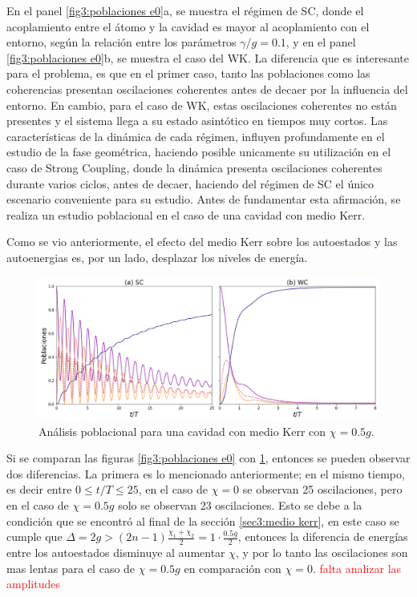 En el panel \ref{fig3:poblaciones e0}a, se muestra el régimen de SC, donde el acoplamiento entre el átomo y la cavidad es mayor al acoplamiento con el entorno, según la relación entre los parámetros $\gamma/g=0.1$, y en el panel \ref{fig3:poblaciones e0}b, se muestra el caso del WK. La diferencia que es interesante para el problema, es que en el primer caso, tanto las poblaciones como las coherencias presentan oscilaciones coherentes antes de decaer por la influencia del entorno. En cambio, para el caso de WK, estas oscilaciones coherentes no están presentes y el sistema llega a su estado asintótico en tiempos muy cortos. Las características de la dinámica de cada régimen, influyen profundamente en el estudio de la fase geométrica, haciendo posible unicamente su utilización en el caso de Strong Coupling, donde la dinámica presenta oscilaciones coherentes durante varios ciclos, antes de decaer, haciendo del régimen de SC el único escenario conveniente para su estudio. Antes de fundamentar esta afirmación, se realiza un estudio poblacional en el caso de una cavidad con medio Kerr.

Como se vio anteriormente, el efecto del medio Kerr sobre los autoestados y las autoenergias es, por un lado, desplazar los niveles de energía.
\begin{figure}
    \centering
    \includegraphics[width=\textwidth]{figuras/ch3/poblaciones kerr.png}
    \caption{Análisis poblacional para una cavidad con medio Kerr con $\chi=0.5g$.}
    \label{fig3:poblaciones kerr}
\end{figure}
Si se comparan las figuras \ref{fig3:poblaciones e0} con \ref{fig3:poblaciones kerr}, entonces se pueden observar dos diferencias. La primera es lo mencionado anteriormente; en el mismo tiempo, es decir entre $0\leq t/T \leq 25$, en el caso de $\chi=0$ se observan 25 oscilaciones, pero en el caso de $\chi=0.5g$ solo se observan 23 oscilaciones. Esto se debe a la condición que se encontró al final de la sección \ref{sec3:medio kerr}, en este caso se cumple que $\Delta=2g>(2n-1)\frac{\chi_1+\chi_2}{2}=1\cdot\frac{0.5g}{2}$, entonces la diferencia de energías entre los autoestados disminuye al aumentar $\chi$, y por lo tanto las oscilaciones son mas lentas para el caso de $\chi=0.5g$ en comparación con $\chi=0$.
\textcolor{red}{falta analizar las amplitudes}
